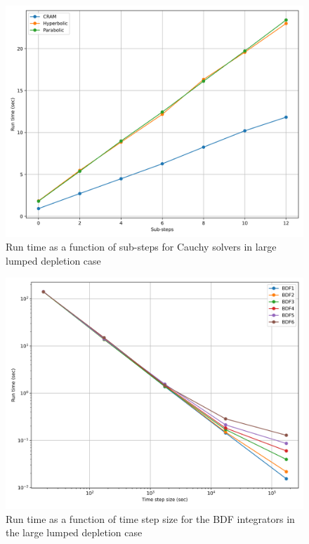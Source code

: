 \clearpage

\begin{figure}[p]
    \centering
    \includegraphics[width=5in]{images/chapter-5/caseStudies/largeLumpedDepletion/msrLumpedDepletionLargeCauchyRuntimes.png}
    \caption{Run time as a function of sub-steps for Cauchy solvers in large lumped depletion case}
    \label{fig:large_lumped_depletion_Cauchy_runtimes}
\end{figure}

\clearpage


\begin{figure}[p]
    \centering
    \includegraphics[width=5in]{images/chapter-5/caseStudies/largeLumpedDepletion/msrLumpedDepletionLargeIntegratorRuntimes.png}
    \caption{Run time as a function of time step size for the BDF integrators in the large lumped depletion case}
    \label{fig:large_lumped_depletion_integrator_runtimes}
\end{figure}

